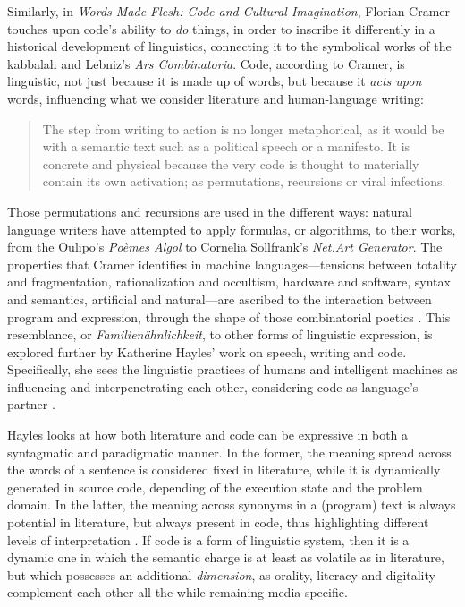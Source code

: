 Similarly, in \emph{Words Made Flesh: Code and Cultural Imagination}, Florian Cramer touches upon code's ability to \emph{do} things, in order to inscribe it differently in a historical development of linguistics, connecting it to the symbolical works of the kabbalah and Lebniz's \emph{Ars Combinatoria}. Code, according to Cramer, is linguistic, not just because it is made up of words, but because it \emph{acts upon} words, influencing what we consider literature and human-language writing:

\begin{quote}
  The step from writing to action is no longer metaphorical, as it would be with a semantic text such as a political speech or a manifesto. It is concrete and physical because the very code is thought to materially contain its own activation; as permutations, recursions or viral infections. \citep{cramer_words_2003}
\end{quote}

Those permutations and recursions are used in the different ways: natural language writers have attempted to apply formulas, or algorithms, to their works, from the Oulipo's \emph{Poèmes Algol} to Cornelia Sollfrank's \emph{Net.Art Generator}. The properties that Cramer identifies in machine languages—tensions between totality and fragmentation, rationalization and occultism, hardware and software, syntax and semantics, artificial and natural—are ascribed to the interaction between program and expression, through the shape of those combinatorial poetics \citep{cramer_words_2003}. This resemblance, or \emph{Familienähnlichkeit}, to other forms of linguistic expression, is explored further by Katherine Hayles' work on speech, writing and code. Specifically, she sees the linguistic practices of humans and intelligent machines as influencing and interpenetrating each other, considering code as language's partner \citep{hayles_print_2004}.

Hayles looks at how both literature and code can be expressive in both a syntagmatic and paradigmatic manner. In the former, the meaning spread across the words of a sentence is considered fixed in literature, while it is dynamically generated in source code, depending of the execution state and the problem domain. In the latter, the meaning across synonyms in a (program) text is always potential in literature, but always present in code, thus highlighting different levels of interpretation \citep{hayles_print_2004}. If code is a form of linguistic system, then it is a dynamic one in which the semantic charge is at least as volatile as in literature, but which possesses an additional \emph{dimension}, as orality, literacy and digitality complement each other all the while remaining media-specific.

